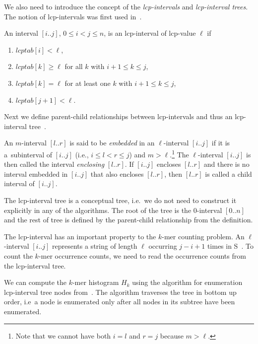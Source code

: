 We also need to introduce the concept of the \emph{lcp-intervals} and \emph{lcp-interval trees}. The notion of lcp-intervals was first used in~\cite{enhancedsuffixarrays}.
\begin{definition}
An interval $[i..j]$, $0 \leq i < j \leq n$, is an lcp-interval of lcp-value $\ell$ if

\begin{enumerate}
\item $lcptab[i] < \ell$,
\item $lcptab[k] \geq \ell$ for all $k$ with $i + 1 \leq k \leq j$,
\item $lcptab[k] = \ell$ for at least one $k$ with $i + 1 \leq k \leq j$,
\item $lcptab[j + 1] < \ell$.
\end{enumerate}
\end{definition}

Next we define parent-child relationships between lcp-intervals and thus an lcp-interval tree~\cite{enhancedsuffixarrays}.

\begin{definition}
  An $m$-interval $[l..r]$ is said to be \emph{embedded} in an $\ell$-interval $[i..j]$ if it is a~subinterval of $[i..j]$ (i.e., $i \leq l < r \leq j $) and $m > \ell$.\footnote{Note that we cannot have both $i = l$ and $r = j$ because $m > \ell$.}
  The $\ell$-interval $[i..j ]$ is then called the interval \emph{enclosing} $[l..r]$. If $[i..j]$ encloses $[l..r]$ and there is no interval embedded in $[i..j]$ that also encloses $[l..r]$, then $[l..r]$ is called a child interval of $[i..j]$.
\end{definition}

The lcp-interval tree is a conceptual tree, i.e.\ we do not need to construct it explicitly in any of the algorithms. The root of the tree is the $0$-interval $[0..n]$ and the rest of tree is defined by the parent-child relationship from the definition.


The lcp-interval has an important property to the $k$-mer counting problem. An $\ell$-interval $[i..j]$ represents a string of length $\ell$ occurring $j - i + 1$ times in S~\cite{tallymer}. To count the $k$-mer occurrence counts, we need to read the occurrence counts from the lcp-interval tree.

We can compute the $k$-mer histogram $H_k$ using the algorithm for enumeration lcp-interval tree nodes from~\cite{enhancedsuffixarrays}. The algorithm traverses the tree in bottom up order, i.e\ a node is enumerated only after all nodes in its subtree have been enumerated.

